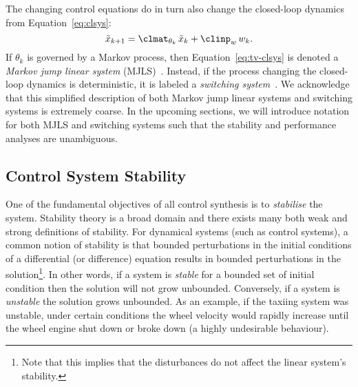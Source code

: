 The changing control equations do in turn also change the closed-loop dynamics from Equation~\eqref{eq:clsys}:
%
\begin{equation}%
    \label{eq:tv-clsys}%
    \tilde{x}_{k+1} = \clmat_{\theta_k}\, \tilde{x}_k + \clinp_w\, w_k.
\end{equation}
%
If $\theta_k$ is governed by a Markov process, then Equation~\eqref{eq:tv-clsys} is denoted a \emph{Markov jump linear system} (MJLS)~\cite{Feng:1992}.
Instead, if the process changing the closed-loop dynamics is deterministic, it is labeled a \emph{switching system}~\cite{Liberzon:2003}.
We acknowledge that this simplified description of both Markov jump linear systems and switching systems is extremely coarse.
In the upcoming sections, we will introduce notation for both MJLS and switching systems such that the stability and performance analyses are unambiguous.



\subsection{Control System Stability}%
\label{sec:background:stability}%
%
One of the fundamental objectives of all control synthesis is to \emph{stabilise} the system.
Stability theory is a broad domain and there exists many both weak and strong definitions of stability.
For dynamical systems (such as control systems), a common notion of stability is that bounded perturbations in the initial conditions of a differential (or difference) equation results in bounded perturbations in the solution\footnote{Note that this implies that the disturbances do not affect the linear system's stability.}.
In other words, if a system is \emph{stable} for a bounded set of initial condition then the solution will not grow unbounded.
Conversely, if a system is \emph{unstable} the solution grows unbounded.
As an example, if the taxiing system was unstable, under certain conditions the wheel velocity would rapidly increase until the wheel engine shut down or broke down (a highly undesirable behaviour).

